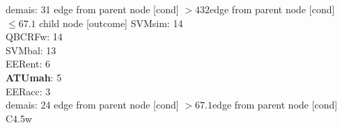 {{{{demais: 31} edge from parent node [cond] {$>432$}}edge from parent node [cond] {$\leq67.1$}}
child {node [outcome] {
SVMsim: 14\\
QBCRFw: 14\\
SVMbal: 13\\
EERent: 6\\
\textbf{ATUmah}: 5\\
EERacc: 3\\
demais: 24} edge from parent node [cond] {$>67.1$}}edge from parent node [cond] {C4.5w}}
